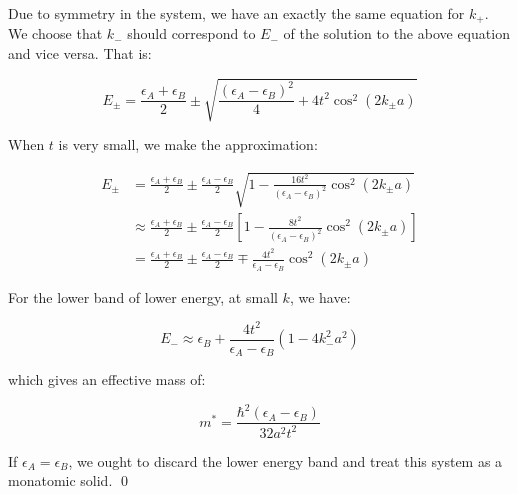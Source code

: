 \documentclass[12pt]{article}
\begin{document}
Due to symmetry in the system, we have an exactly the same equation for $k_{+}$. We choose that $k_{-}$ should correspond to $E_{-}$ of the solution to the above equation and vice versa. That is:

\begin{equation}
    E_{\pm} = \frac{\epsilon_{A} + \epsilon_{B}}{2} \pm \sqrt{\frac{(\epsilon_{A} - \epsilon_{B})^{2}}{4} + 4t^{2} \cos^{2}{(2k_{\pm}a)}}
\end{equation}

When $t$ is very small, we make the approximation:

\begin{equation}
    \begin{split}
        E_{\pm} &= \frac{\epsilon_{A} + \epsilon_{B}}{2} \pm \frac{\epsilon_{A} - \epsilon_{B}}{2} \sqrt{1 - \frac{16t^{2}}{(\epsilon_{A} - \epsilon_{B})^{2}} \cos^{2}{(2k_{\pm}a)}} \\
        &\approx \frac{\epsilon_{A} + \epsilon_{B}}{2} \pm \frac{\epsilon_{A} - \epsilon_{B}}{2} \left[ 1 - \frac{8t^{2}}{(\epsilon_{A} - \epsilon_{B})^{2}} \cos^{2}{(2k_{\pm}a)} \right] \\
        &= \frac{\epsilon_{A} + \epsilon_{B}}{2} \pm \frac{\epsilon_{A} - \epsilon_{B}}{2} \mp \frac{4t^{2}}{\epsilon_{A} - \epsilon_{B}} \cos^{2}{(2k_{\pm}a)}
    \end{split}
\end{equation}

For the lower band of lower energy, at small $k$, we have:

\begin{equation}
    E_{-} \approx \epsilon_{B} + \frac{4t^{2}}{\epsilon_{A} - \epsilon_{B}} (1 - 4k_{-}^{2}a^{2})
\end{equation}

which gives an effective mass of:

\begin{equation}
    m^{*} = \frac{\hbar^{2}(\epsilon_{A} - \epsilon_{B})}{32a^{2}t^{2}}
\end{equation}

If $\epsilon_{A} = \epsilon_{B}$, we ought to discard the lower energy band and treat this system as a monatomic solid.
\qed
\end{document}
